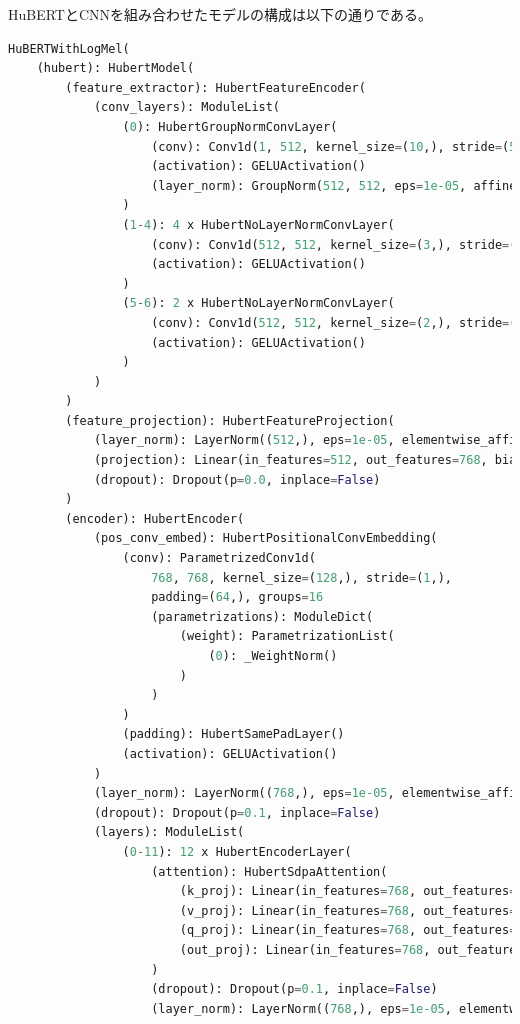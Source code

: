 \documentclass[10pt]{ltjsarticle}
\begin{document}
HuBERTとCNNを組み合わせたモデルの構成は以下の通りである。

\begin{lstlisting}[language=Python]
HuBERTWithLogMel(
    (hubert): HubertModel(
        (feature_extractor): HubertFeatureEncoder(
            (conv_layers): ModuleList(
                (0): HubertGroupNormConvLayer(
                    (conv): Conv1d(1, 512, kernel_size=(10,), stride=(5,), bias=False)
                    (activation): GELUActivation()
                    (layer_norm): GroupNorm(512, 512, eps=1e-05, affine=True)
                )
                (1-4): 4 x HubertNoLayerNormConvLayer(
                    (conv): Conv1d(512, 512, kernel_size=(3,), stride=(2,), bias=False)
                    (activation): GELUActivation()
                )
                (5-6): 2 x HubertNoLayerNormConvLayer(
                    (conv): Conv1d(512, 512, kernel_size=(2,), stride=(2,), bias=False)
                    (activation): GELUActivation()
                )
            )
        )
        (feature_projection): HubertFeatureProjection(
            (layer_norm): LayerNorm((512,), eps=1e-05, elementwise_affine=True)
            (projection): Linear(in_features=512, out_features=768, bias=True)
            (dropout): Dropout(p=0.0, inplace=False)
        )
        (encoder): HubertEncoder(
            (pos_conv_embed): HubertPositionalConvEmbedding(
                (conv): ParametrizedConv1d(
                    768, 768, kernel_size=(128,), stride=(1,),
                    padding=(64,), groups=16
                    (parametrizations): ModuleDict(
                        (weight): ParametrizationList(
                            (0): _WeightNorm()
                        )
                    )
                )
                (padding): HubertSamePadLayer()
                (activation): GELUActivation()
            )
            (layer_norm): LayerNorm((768,), eps=1e-05, elementwise_affine=True)
            (dropout): Dropout(p=0.1, inplace=False)
            (layers): ModuleList(
                (0-11): 12 x HubertEncoderLayer(
                    (attention): HubertSdpaAttention(
                        (k_proj): Linear(in_features=768, out_features=768, bias=True)
                        (v_proj): Linear(in_features=768, out_features=768, bias=True)
                        (q_proj): Linear(in_features=768, out_features=768, bias=True)
                        (out_proj): Linear(in_features=768, out_features=768, bias=True)
                    )
                    (dropout): Dropout(p=0.1, inplace=False)
                    (layer_norm): LayerNorm((768,), eps=1e-05, elementwise_affine=True)

\end{lstlisting}
\end{document}
